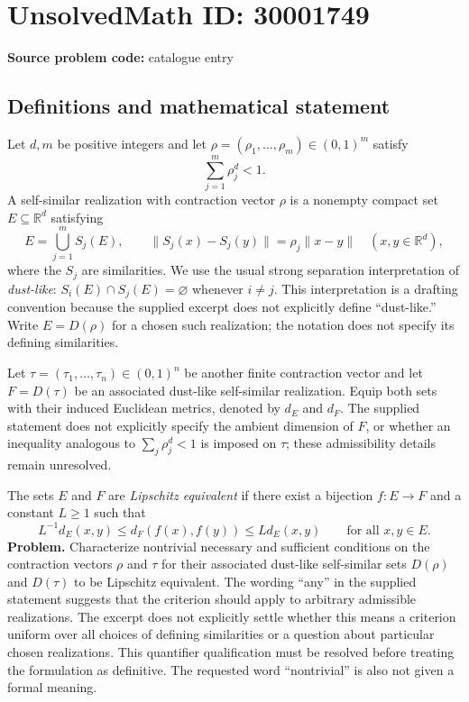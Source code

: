 \documentclass[11pt]{article}
\newcommand{\R}{\mathbb{R}}
\begin{document}
\section*{UnsolvedMath ID: 30001749}
\textbf{Source problem code:} catalogue entry
\subsection{Definitions and mathematical statement}
Let \(d,m\) be positive integers and let \(\rho=(\rho_1,\ldots,\rho_m)\in(0,1)^m\) satisfy
\[
\sum_{j=1}^{m}\rho_j^d<1.
\]
A self-similar realization with contraction vector \(\rho\) is a nonempty compact set \(E\subseteq\R^d\) satisfying
\[
E=\bigcup_{j=1}^{m}S_j(E),\qquad
\|S_j(x)-S_j(y)\|=\rho_j\|x-y\|\quad(x,y\in\R^d),
\]
where the \(S_j\) are similarities. We use the usual strong separation interpretation of \emph{dust-like}: \(S_i(E)\cap S_j(E)=\varnothing\) whenever \(i\ne j\). This interpretation is a drafting convention because the supplied excerpt does not explicitly define ``dust-like.'' Write \(E=D(\rho)\) for a chosen such realization; the notation does not specify its defining similarities.

Let \(\tau=(\tau_1,\ldots,\tau_n)\in(0,1)^n\) be another finite contraction vector and let \(F=D(\tau)\) be an associated dust-like self-similar realization. Equip both sets with their induced Euclidean metrics, denoted by \(d_E\) and \(d_F\). The supplied statement does not explicitly specify the ambient dimension of \(F\), or whether an inequality analogous to \(\sum_j\rho_j^d<1\) is imposed on \(\tau\); these admissibility details remain unresolved.

The sets \(E\) and \(F\) are \emph{Lipschitz equivalent} if there exist a bijection \(f:E\to F\) and a constant \(L\geq1\) such that
\[
L^{-1}d_E(x,y)\leq d_F(f(x),f(y))\leq Ld_E(x,y)
\qquad\text{for all }x,y\in E.
\]
\textbf{Problem.} Characterize nontrivial necessary and sufficient conditions on the contraction vectors \(\rho\) and \(\tau\) for their associated dust-like self-similar sets \(D(\rho)\) and \(D(\tau)\) to be Lipschitz equivalent. The wording ``any'' in the supplied statement suggests that the criterion should apply to arbitrary admissible realizations. The excerpt does not explicitly settle whether this means a criterion uniform over all choices of defining similarities or a question about particular chosen realizations. This quantifier qualification must be resolved before treating the formulation as definitive. The requested word ``nontrivial'' is also not given a formal meaning.
\end{document}
